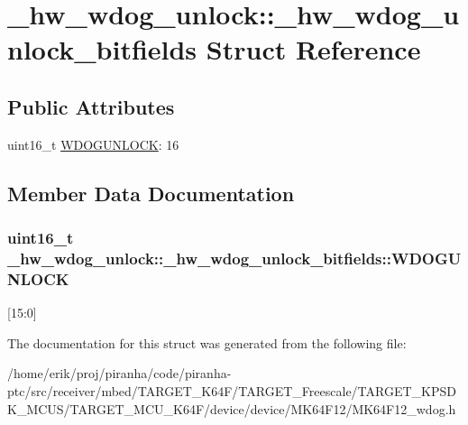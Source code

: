 \hypertarget{struct__hw__wdog__unlock_1_1__hw__wdog__unlock__bitfields}{}\section{\+\_\+hw\+\_\+wdog\+\_\+unlock\+:\+:\+\_\+hw\+\_\+wdog\+\_\+unlock\+\_\+bitfields Struct Reference}
\label{struct__hw__wdog__unlock_1_1__hw__wdog__unlock__bitfields}
\subsection*{Public Attributes}
\begin{DoxyCompactItemize}
\item 
uint16\+\_\+t \hyperlink{struct__hw__wdog__unlock_1_1__hw__wdog__unlock__bitfields_a365d157f79a5f7a5bdbb7f82cf1273f8}{W\+D\+O\+G\+U\+N\+L\+O\+CK}\+: 16
\end{DoxyCompactItemize}


\subsection{Member Data Documentation}
\subsubsection[{\texorpdfstring{W\+D\+O\+G\+U\+N\+L\+O\+CK}{WDOGUNLOCK}}]{\setlength{\rightskip}{0pt plus 5cm}uint16\+\_\+t \+\_\+hw\+\_\+wdog\+\_\+unlock\+::\+\_\+hw\+\_\+wdog\+\_\+unlock\+\_\+bitfields\+::\+W\+D\+O\+G\+U\+N\+L\+O\+CK}\hypertarget{struct__hw__wdog__unlock_1_1__hw__wdog__unlock__bitfields_a365d157f79a5f7a5bdbb7f82cf1273f8}{}\label{struct__hw__wdog__unlock_1_1__hw__wdog__unlock__bitfields_a365d157f79a5f7a5bdbb7f82cf1273f8}
\mbox{[}15\+:0\mbox{]} 

The documentation for this struct was generated from the following file\+:\begin{DoxyCompactItemize}
\item 
/home/erik/proj/piranha/code/piranha-\/ptc/src/receiver/mbed/\+T\+A\+R\+G\+E\+T\+\_\+\+K64\+F/\+T\+A\+R\+G\+E\+T\+\_\+\+Freescale/\+T\+A\+R\+G\+E\+T\+\_\+\+K\+P\+S\+D\+K\+\_\+\+M\+C\+U\+S/\+T\+A\+R\+G\+E\+T\+\_\+\+M\+C\+U\+\_\+\+K64\+F/device/device/\+M\+K64\+F12/M\+K64\+F12\+\_\+wdog.\+h\end{DoxyCompactItemize}
